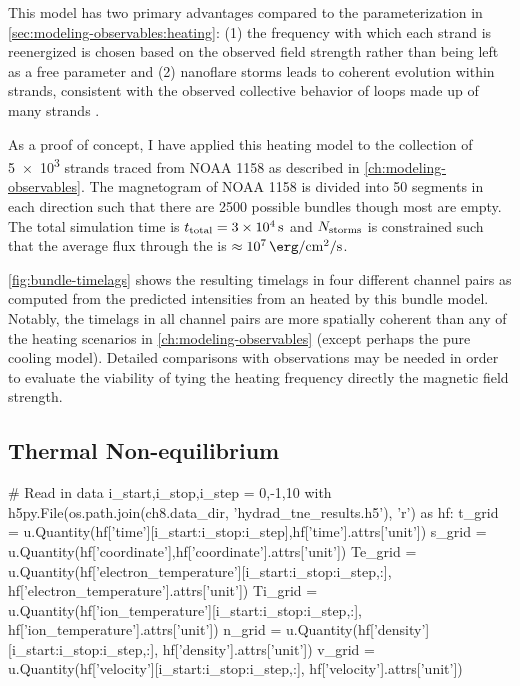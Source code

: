 This model has two primary advantages compared to the parameterization in \autoref{sec:modeling-observables:heating}: (1) the frequency with which each strand is reenergized is chosen based on the observed field strength rather than being left as a free parameter and (2) nanoflare storms leads to coherent evolution within strands, consistent with the observed collective behavior of loops made up of many strands \citep{klimchuk_key_2015}.

As a proof of concept, I have applied this heating model to the collection of \num{5e3} strands traced from NOAA 1158 as described in \autoref{ch:modeling-observables}. The magnetogram of NOAA 1158 is divided into 50 segments in each direction such that there are 2500 possible bundles though most are empty. The total simulation time is $t_\textup{total}=\SI{3e4}{\second}$ and $N_\textup{storms}$ is constrained such that the average flux through the \AR{} is $\approx\SI{e7}{\erg\per\square\cm\per\second}$.

\autoref{fig:bundle-timelags} shows the resulting timelags in four different channel pairs as computed from the predicted intensities from an \AR{} heated by this bundle model. Notably, the timelags in all channel pairs are more spatially coherent than any of the heating scenarios in \autoref{ch:modeling-observables} (except perhaps the pure cooling model). Detailed comparisons with observations may be needed in order to evaluate the viability of tying the heating frequency directly the magnetic field strength.

\subsection{Thermal Non-equilibrium}\label{sec:tne}

\begin{pycode}[chapter8]
# Read in data
i_start,i_stop,i_step = 0,-1,10
with h5py.File(os.path.join(ch8.data_dir, 'hydrad_tne_results.h5'), 'r') as hf:
    t_grid = u.Quantity(hf['time'][i_start:i_stop:i_step],hf['time'].attrs['unit'])
    s_grid = u.Quantity(hf['coordinate'],hf['coordinate'].attrs['unit'])
    Te_grid = u.Quantity(hf['electron_temperature'][i_start:i_stop:i_step,:],
                         hf['electron_temperature'].attrs['unit'])
    Ti_grid = u.Quantity(hf['ion_temperature'][i_start:i_stop:i_step,:],
                         hf['ion_temperature'].attrs['unit'])
    n_grid = u.Quantity(hf['density'][i_start:i_stop:i_step,:],
                        hf['density'].attrs['unit'])
    v_grid = u.Quantity(hf['velocity'][i_start:i_stop:i_step,:],
                        hf['velocity'].attrs['unit'])
\end{pycode}

